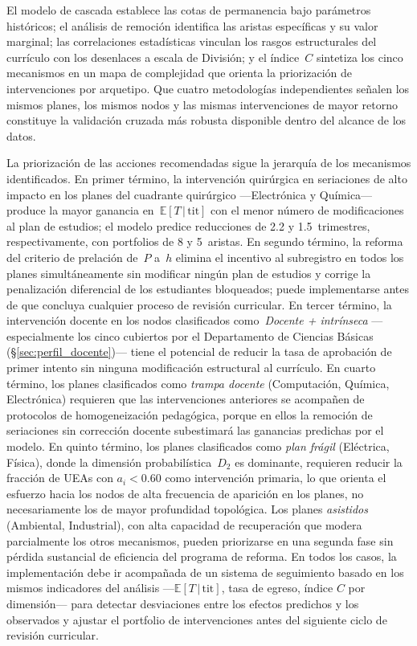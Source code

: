 \documentclass[11pt,letterpaper]{article}
\newcommand{\ETtit}{\mathbb{E}[T\,|\,\mathrm{tit}]}
\begin{document}
El modelo de cascada establece las cotas de permanencia bajo parámetros históricos;
el análisis de remoción identifica las aristas específicas y su valor marginal; las
correlaciones estadísticas vinculan los rasgos estructurales del currículo con los
desenlaces a escala de División; y el índice~$C$ sintetiza los cinco mecanismos en un
mapa de complejidad que orienta la priorización de intervenciones por arquetipo.
Que cuatro metodologías independientes señalen los mismos planes, los mismos nodos y
las mismas intervenciones de mayor retorno constituye la validación cruzada más robusta
disponible dentro del alcance de los datos.

La priorización de las acciones recomendadas sigue la jerarquía de los mecanismos
identificados.
En primer término, la intervención quirúrgica en seriaciones de alto impacto en los planes
del cuadrante quirúrgico ---Electrónica y Química--- produce la mayor ganancia en~$\ETtit$
con el menor número de modificaciones al plan de estudios; el modelo predice reducciones de
2.2 y 1.5~trimestres, respectivamente, con portfolios de 8 y 5~aristas.
En segundo término, la reforma del criterio de prelación de~$P$ a~$h$ elimina el incentivo
al subregistro en todos los planes simultáneamente sin modificar ningún plan de estudios
y corrige la penalización diferencial de los estudiantes bloqueados; puede implementarse
antes de que concluya cualquier proceso de revisión curricular.
En tercer término, la intervención docente en los nodos clasificados como~\emph{Docente +
intrínseca} ---especialmente los cinco cubiertos por el Departamento de Ciencias Básicas
(\S\ref{sec:perfil_docente})--- tiene el potencial de reducir la tasa de aprobación de
primer intento sin ninguna modificación estructural al currículo.
En cuarto término, los planes clasificados como \emph{trampa docente} (Computación, Química,
Electrónica) requieren que las intervenciones anteriores se acompañen de protocolos de
homogeneización pedagógica, porque en ellos la remoción de seriaciones sin corrección
docente subestimará las ganancias predichas por el modelo.
En quinto término, los planes clasificados como \emph{plan frágil} (Eléctrica, Física),
donde la dimensión probabilística~$D_2$ es dominante, requieren reducir la fracción de
UEAs con $a_i<0.60$ como intervención primaria, lo que orienta el esfuerzo hacia los
nodos de alta frecuencia de aparición en los planes, no necesariamente los de mayor
profundidad topológica.
Los planes \emph{asistidos} (Ambiental, Industrial), con alta capacidad de recuperación
que modera parcialmente los otros mecanismos, pueden priorizarse en una segunda fase
sin pérdida sustancial de eficiencia del programa de reforma.
En todos los casos, la implementación debe ir acompañada de un sistema de seguimiento
basado en los mismos indicadores del análisis ---$\ETtit$, tasa de egreso, índice
$C$ por dimensión--- para detectar desviaciones entre los efectos predichos y los
observados y ajustar el portfolio de intervenciones antes del siguiente ciclo
de revisión curricular.
\end{document}
